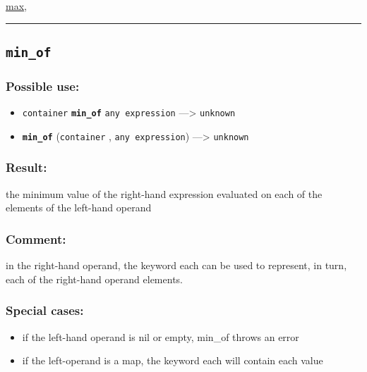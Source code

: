 \documentclass[]{book}
\providecommand{\tightlist}{%
  \setlength{\itemsep}{0pt}\setlength{\parskip}{0pt}}
\theoremstyle{definition}
\theoremstyle{definition}
\theoremstyle{definition}
\theoremstyle{remark}
\begin{document}
\href{OperatorsIM\#max}{max},

\begin{center}\rule{0.5\linewidth}{\linethickness}\end{center}

\subsection{\texorpdfstring{\texttt{min\_of}}{min\_of}}\label{min_of}

\subsubsection{Possible use:}\label{possible-use-352}

\begin{itemize}
\tightlist
\item
  \texttt{container} \textbf{\texttt{min\_of}} \texttt{any\ expression}
  ---\textgreater{} \texttt{unknown}
\item
  \textbf{\texttt{min\_of}} (\texttt{container} ,
  \texttt{any\ expression}) ---\textgreater{} \texttt{unknown}
\end{itemize}

\subsubsection{Result:}\label{result-341}

the minimum value of the right-hand expression evaluated on each of the
elements of the left-hand operand

\subsubsection{Comment:}\label{comment-71}

in the right-hand operand, the keyword each can be used to represent, in
turn, each of the right-hand operand elements.

\subsubsection{Special cases:}\label{special-cases-99}

\begin{itemize}
\tightlist
\item
  if the left-hand operand is nil or empty, min\_of throws an error\\
\item
  if the left-operand is a map, the keyword each will contain each value
\end{itemize}
\end{document}
